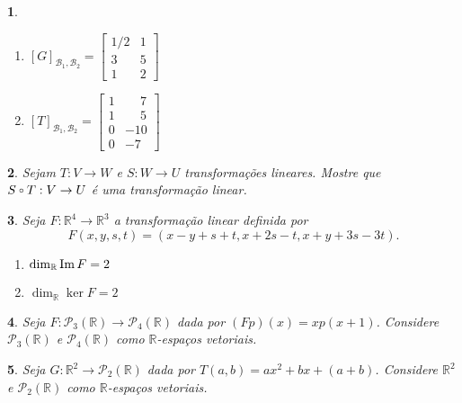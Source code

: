 \documentclass[12pt]{exam}
\newtheorem{exercicio}{}
\newcommand{\im}{{\rm Im\,}}
\newcommand{\real}{\mathbb{R}}
\newcommand{\compcent}[1]{\vcenter{\hbox{$#1\circ$}}}
\newcommand{\comp}{\mathbin{\mathchoice
{\compcent\scriptstyle}{\compcent\scriptstyle}
{\compcent\scriptscriptstyle}{\compcent\scriptscriptstyle}}}
\begin{document}
\begin{exercicio}
\begin{solucao}
\begin{enumerate}[label=({\alph*})]
        \item $[G]_{\mathcal{B}_1, \mathcal{B}_2} = \begin{bmatrix}
          1/2 & 1\\
          3 & 5\\
          1 & 2
        \end{bmatrix}$

        \item $[T]_{\mathcal{B}_1, \mathcal{B}_2} = \begin{bmatrix}
          1 & \phantom{-}7\\
          1 & \phantom{-}5\\
          0 & -10\\
          0 & -7
        \end{bmatrix}$
      \end{enumerate}
    \end{solucao}
\end{exercicio}

\begin{exercicio}
  Sejam $T : V \to W$ e $S : W \to U$ transforma\c{c}\~oes lineares. Mostre que $S \comp T : V \to U$ \'e uma transforma\c{c}\~ao linear.
\end{exercicio}


\begin{exercicio}\label{nucleo_imagem_inicio}
  Seja $F : \real^4 \to \real^3$ a transforma\c{c}\~ao linear definida por
  \[
    F(x,y,s,t) = (x - y + s + t, x + 2s - t, x + y + 3s - 3t).
  \]
  \begin{solucao}
    \begin{enumerate}[label=({\alph*})]
      \item $\dim_\real\im F = 2$
      \item $\dim_\real\ker F = 2$
    \end{enumerate}
  \end{solucao}
\end{exercicio}

\begin{exercicio}
Seja $F : \mathcal{P}_3(\real) \to \mathcal{P}_4(\real)$ dada por $(Fp)(x) = xp(x + 1)$. Considere $\mathcal{P}_3(\real)$ e $\mathcal{P}_4(\real)$ como $\real$-espa\c{c}os vetoriais.
\end{exercicio}

\begin{exercicio}
  Seja $G : \real^2 \to \mathcal{P}_2(\real)$ dada por $T(a,b) = ax^2 + bx + (a + b)$. Considere $\real^2$ e $\mathcal{P}_2(\real)$ como $\real$-espa\c{c}os vetoriais.
\end{exercicio}
\end{document}
